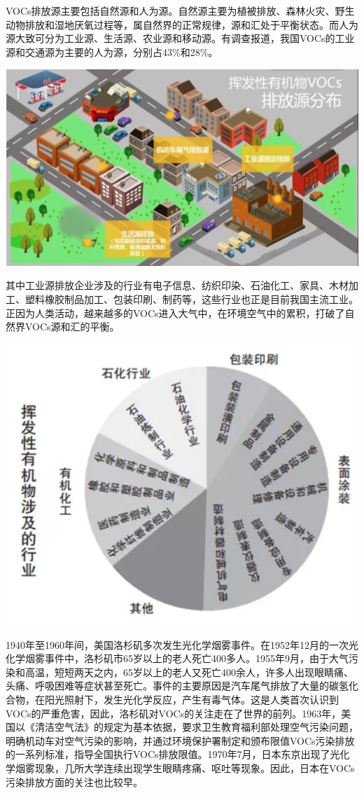 \documentclass[]{book}
\begin{document}
VOCs排放源主要包括自然源和人为源。自然源主要为植被排放、森林火灾、野生动物排放和湿地厌氧过程等，属自然界的正常规律，源和汇处于平衡状态。而人为源大致可分为工业源、生活源、农业源和移动源。有调查报道，我国VOCs的工业源和交通源为主要的人为源，分别占43\%和28\%。

\includegraphics[width=8.33in]{images/voc4}

其中工业源排放企业涉及的行业有电子信息、纺织印染、石油化工、家具、木材加工、塑料橡胶制品加工、包装印刷、制药等，这些行业也正是目前我国主流工业。正因为人类活动，越来越多的VOCs进入大气中，在环境空气中的累积，打破了自然界VOCs源和汇的平衡。

\includegraphics[width=8.33in]{images/voc5}

1940年至1960年间，美国洛杉矶多次发生光化学烟雾事件。在1952年12月的一次光化学烟雾事件中，洛杉矶市65岁以上的老人死亡400多人。1955年9月，由于大气污染和高温，短短两天之内，65岁以上的老人又死亡400余人，许多人出现眼睛痛、头痛、呼吸困难等症状甚至死亡。事件的主要原因是汽车尾气排放了大量的碳氢化合物，在阳光照射下，发生光化学反应，产生有毒气体。这是人类首次认识到VOCs的严重危害，因此，洛杉矶对VOCs的关注走在了世界的前列。1963年，美国以《清洁空气法》的规定为基本依据，要求卫生教育福利部处理空气污染问题，明确机动车对空气污染的影响，并通过环境保护署制定和颁布限值VOCs污染排放的一系列标准，指导全国执行VOCs排放限值。1970年7月，日本东京出现了光化学烟雾现象，几所大学连续出现学生眼睛疼痛、呕吐等现象。因此，日本在VOCs污染排放方面的关注也比较早。
\end{document}
